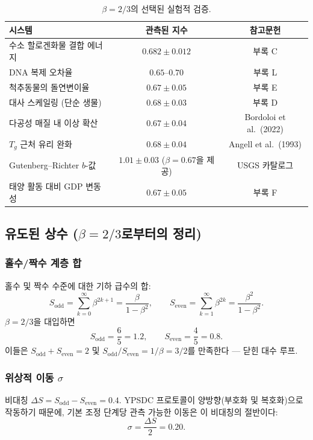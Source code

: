\documentclass[11pt,a4paper]{article}
\begin{document}
	\begin{table}[H]
		\centering
		\caption{\(\beta = 2/3\)의 선택된 실험적 검증.}
		\label{tab:beta-evidence}
		\small
		\begin{tabular}{l c c}
			\toprule
			\textbf{시스템} & \textbf{관측된 지수} & \textbf{참고문헌} \\
			\midrule
			수소 할로겐화물 결합 에너지 & \(0.682 \pm 0.012\) & 부록 C \\
			DNA 복제 오차율 & \(0.65\)–\(0.70\) & 부록 L \\
			척추동물의 돌연변이율 & \(0.67 \pm 0.05\) & 부록 E \\
			대사 스케일링 (단순 생물) & \(0.68 \pm 0.03\) & 부록 D \\
			다공성 매질 내 이상 확산 & \(0.67 \pm 0.04\) & Bordoloi et al.\ (2022) \\
			\(T_g\) 근처 유리 완화 & \(0.68 \pm 0.04\) & Angell et al.\ (1993) \\
			Gutenberg–Richter \(b\)-값 & \(1.01 \pm 0.03\) (\(\beta=0.67\)을 제공) & USGS 카탈로그 \\
			태양 활동 대비 GDP 변동성 & \(0.67 \pm 0.05\) & 부록 F \\
			\bottomrule
		\end{tabular}
	\end{table}
	
	\subsection{유도된 상수 (\(\beta = 2/3\)로부터의 정리)}
	
	\subsubsection{홀수/짝수 계층 합}
	홀수 및 짝수 수준에 대한 기하 급수의 합:
	\[
	S_{\mathrm{odd}} = \sum_{k=0}^{\infty} \beta^{2k+1} = \frac{\beta}{1-\beta^2},\qquad
	S_{\mathrm{even}} = \sum_{k=1}^{\infty} \beta^{2k} = \frac{\beta^2}{1-\beta^2}.
	\]
	\(\beta = 2/3\)을 대입하면
	\[
	\boxed{S_{\mathrm{odd}} = \frac{6}{5}=1.2,\qquad S_{\mathrm{even}} = \frac{4}{5}=0.8}.
	\]
	이들은 \(S_{\mathrm{odd}}+S_{\mathrm{even}}=2\) 및 \(S_{\mathrm{odd}}/S_{\mathrm{even}} = 1/\beta = 3/2\)를 만족한다 — 닫힌 대수 루프.
	
	\subsubsection{위상적 이동 \(\sigma\)}
	비대칭 \(\Delta S = S_{\mathrm{odd}}-S_{\mathrm{even}} = 0.4\). YPSDC 프로토콜이 양방향(부호화 및 복호화)으로 작동하기 때문에, 기본 조정 단계당 관측 가능한 이동은 이 비대칭의 절반이다:
	\[
	\boxed{\sigma = \frac{\Delta S}{2} = 0.20}.
	\]
	
\end{document}
